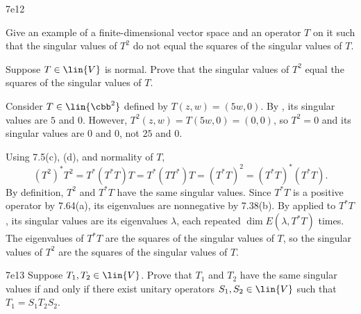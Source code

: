 \begin{exercise}{7e12}
    \begin{subexercises}
        \item Give an example of a finite-dimensional vector space and an operator $T$ on it such that the singular values of $T^2$ do not equal the squares of the singular values of $T$.
        \item Suppose $T \in \lin{V}$ is normal.
        Prove that the singular values of $T^2$ equal the squares of the singular values of $T$.
    \end{subexercises}
\end{exercise}

\begin{solenum}
    \item Consider $T \in \lin{\cbb^2}$ defined by $T(z, w) = (5w, 0)$.
    By , its singular values are $5$ and $0$.
    However, $T^2(z, w) = T(5w, 0) = (0, 0)$, so $T^2 = 0$ and its singular values are $0$ and $0$, not $25$ and $0$.
    \item Using 7.5(c), (d), and normality of $T$,
    \[
        (T^2)^\ast T^2 = T^\ast(T^\ast T)T = T^\ast (TT^\ast) T = (T^\ast T)^2 = (T^\ast T)^\ast (T^\ast T).
    \]
    By definition, $T^2$ and $T^\ast T$ have the same singular values.
    Since $T^\ast T$ is a positive operator by 7.64(a), its eigenvalues are nonnegative by 7.38(b).
    By  applied to $T^\ast T$, its singular values are its eigenvalues $\lambda$, each repeated $\dim E(\lambda, T^\ast T)$ times.
    The eigenvalues of $T^\ast T$ are the squares of the singular values of $T$, so the singular values of $T^2$ are the squares of the singular values of $T$.
\end{solenum}

\begin{exercise}{7e13}
    Suppose $T_1, T_2 \in \lin{V}$.
    Prove that $T_1$ and $T_2$ have the same singular values if and only if there exist unitary operators $S_1, S_2 \in \lin{V}$ such that $T_1 = S_1 T_2 S_2$.
\end{exercise}

